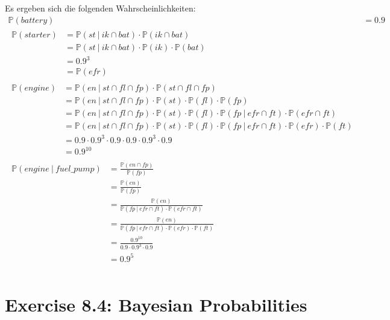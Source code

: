 \documentclass[a4paper]{scrartcl}
\newcommand{\prob}{\mathbb{P}}
\def \blattnr {8}
\begin{document}
Es ergeben sich die folgenden Wahrscheinlichkeiten:
\begin{align*}
    \prob(battery) &= \num{0,9} \\
    \begin{split}
        \prob(starter)
        &= \prob(st\ |\ ik \cap bat) \cdot \prob(ik \cap bat) \\
        &= \prob(st\ |\ ik \cap bat) \cdot \prob(ik) \cdot \prob(bat) \\
        &=\num{0,9}^3 \\
        &= \prob(efr)
    \end{split} \\
    \begin{split}
        \prob(engine)
        &= \prob(en\ |\ st \cap fl \cap fp) \cdot \prob(st \cap fl \cap fp) \\
        &= \prob(en\ |\ st \cap fl \cap fp) \cdot \prob(st) \cdot
           \prob(fl) \cdot \prob(fp) \\
        &= \prob(en\ |\ st \cap fl \cap fp) \cdot \prob(st) \cdot
           \prob(fl) \cdot \prob(fp\ |\ efr \cap ft) \cdot \prob(efr \cap ft) \\
        &= \prob(en\ |\ st \cap fl \cap fp) \cdot \prob(st) \cdot
           \prob(fl) \cdot \prob(fp\ |\ efr \cap ft) \cdot \prob(efr) \cdot \prob(ft) \\
        &= \num{0,9} \cdot \num{0,9}^3 \cdot \num{0,9} \cdot \num{0,9} \cdot
           \num{0,9}^3 \cdot \num{0,9} \\
        &= \num{0,9}^{10}
    \end{split} \\
    \begin{split}
        \prob(engine\ |\ fuel\_pump)
        &= \frac{\prob(en \cap fp)}{\prob(fp)} \\
        &= \frac{\prob(en)}{\prob(fp)} \\
        &= \frac{\prob(en)}{\prob(fp\ |\ efr \cap ft) \cdot \prob(efr \cap ft)} \\
        &= \frac{\prob(en)}{\prob(fp\ |\ efr \cap ft) \cdot \prob(efr) \cdot \prob(ft)} \\
        &= \frac{\num{0,9}^{10}}{\num{0,9} \cdot \num{0,9}^3 \cdot \num{0,9}} \\
        &= \num{0,9}^5 \\
    \end{split}
\end{align*}


\section*{Exercise \blattnr.4: Bayesian Probabilities}
\end{document}
